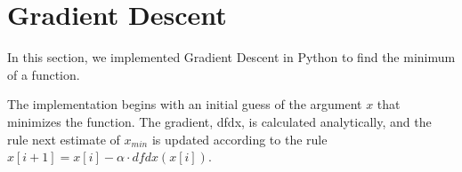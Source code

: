 \section{Gradient Descent} \label{sec:prob1}

In this section, we implemented Gradient Descent in Python to find the minimum of a function.

The implementation begins with an initial guess of the argument $x$ that minimizes the function.
The gradient, dfdx, is calculated analytically, and the rule next estimate of $x_{min}$ is updated according to the rule $x[i+1] = x[i] - \alpha \cdot dfdx(x[i])$.











